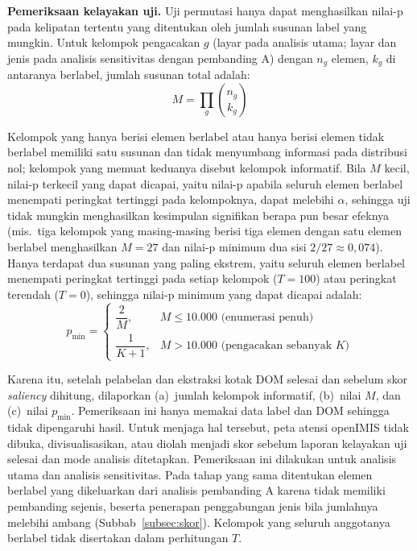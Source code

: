\textbf{Pemeriksaan kelayakan uji.} Uji permutasi hanya dapat menghasilkan nilai-p pada kelipatan tertentu yang ditentukan oleh jumlah susunan label yang mungkin. Untuk kelompok pengacakan $g$ (layar pada analisis utama; layar dan jenis pada analisis sensitivitas dengan pembanding A) dengan $n_g$ elemen, $k_g$ di antaranya berlabel, jumlah susunan total adalah:
\begin{equation}
  M = \prod_{g} \binom{n_g}{k_g}
  \label{eq:susunan}
\end{equation}

Kelompok yang hanya berisi elemen berlabel atau hanya berisi elemen tidak berlabel memiliki satu susunan dan tidak menyumbang informasi pada distribusi nol; kelompok yang memuat keduanya disebut kelompok informatif. Bila $M$ kecil, nilai-p terkecil yang dapat dicapai, yaitu nilai-p apabila seluruh elemen berlabel menempati peringkat tertinggi pada kelompoknya, dapat melebihi $\alpha$, sehingga uji tidak mungkin menghasilkan kesimpulan signifikan berapa pun besar efeknya (mis.\ tiga kelompok yang masing-masing berisi tiga elemen dengan satu elemen berlabel menghasilkan $M = 27$ dan nilai-p minimum dua sisi $2/27 \approx 0{,}074$). Hanya terdapat dua susunan yang paling ekstrem, yaitu seluruh elemen berlabel menempati peringkat tertinggi pada setiap kelompok ($T = 100$) atau peringkat terendah ($T = 0$), sehingga nilai-p minimum yang dapat dicapai adalah:
\begin{equation}
  p_{\min} =
  \begin{cases}
    \dfrac{2}{M}, & M \leq 10.000 \text{ (enumerasi penuh)} \\[2mm]
    \dfrac{1}{K+1}, & M > 10.000 \text{ (pengacakan sebanyak } K\text{)}
  \end{cases}
  \label{eq:pmin}
\end{equation}

Karena itu, setelah pelabelan dan ekstraksi kotak DOM selesai dan sebelum skor \emph{saliency} dihitung, dilaporkan (a)~jumlah kelompok informatif, (b)~nilai $M$, dan (c)~nilai $p_{\min}$. Pemeriksaan ini hanya memakai data label dan DOM sehingga tidak dipengaruhi hasil. Untuk menjaga hal tersebut, peta atensi openIMIS tidak dibuka, divisualisasikan, atau diolah menjadi skor sebelum laporan kelayakan uji selesai dan mode analisis ditetapkan. Pemeriksaan ini dilakukan untuk analisis utama dan analisis sensitivitas. Pada tahap yang sama ditentukan elemen berlabel yang dikeluarkan dari analisis pembanding A karena tidak memiliki pembanding sejenis, beserta penerapan penggabungan jenis bila jumlahnya melebihi ambang (Subbab~\ref{subsec:skor}). Kelompok yang seluruh anggotanya berlabel tidak disertakan dalam perhitungan $T$.

